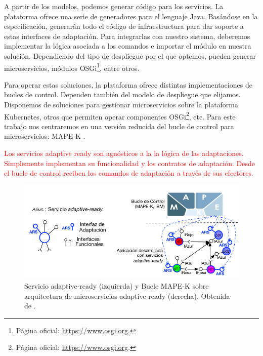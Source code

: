 A partir de los modelos, podemos generar código para los servicios. La plataforma ofrece una serie de generadores para el lenguaje Java. Basándose en la especificación, generarán todo el código de infraestructura para dar soporte a estas interfaces de adaptación. Para integrarlas con nuestro sistema, deberemos implementar la lógica asociada a los comandos e importar el módulo en nuestra solución. Dependiendo del tipo de despliegue por el que optemos, pueden generar microservicios, módulos OSGi\footnote{Página oficial: \url{https://www.osgi.org}.}, entre otros.

Para operar estas soluciones, la plataforma ofrece distintas implementaciones de bucles de control. Dependen también del modelo de despliegue que elijamos. Disponemos de soluciones para gestionar microservicios sobre la plataforma Kubernetes\cite{fonsServiciosAdaptivereadyPara2021}, otros que permiten operar componentes OSGi\footnote{Página oficial: \url{https://www.osgi.org}.}, etc. Para este trabajo nos centraremos en una versión reducida del bucle de control para microservicios: MAPE-K .

\textcolor{red}{Los servicios adaptive ready son agnósticos a la la lógica de las adaptaciones. Simplemente implementan su funcionalidad y los contratos de adaptación. Desde el bucle de control reciben los comandos de adaptación a través de sus efectores.}

\begin{figure}[htb]
  \centering
  \includegraphics[scale=0.4]{cap_sistema_original/images/adaptive-ready-services}
  \caption[Servicio adaptive-ready y Bucle MAPE-K sobre arquitectura de mi-
  croservicios adaptive-ready.]{Servicio adaptive-ready (izquierda) y Bucle MAPE-K sobre arquitectura de microservicios adaptive-ready (derecha). Obtenida de \cite{fonsServiciosAdaptivereadyPara2021}.}
  \label{fig:adaptive-ready-services}
\end{figure}


